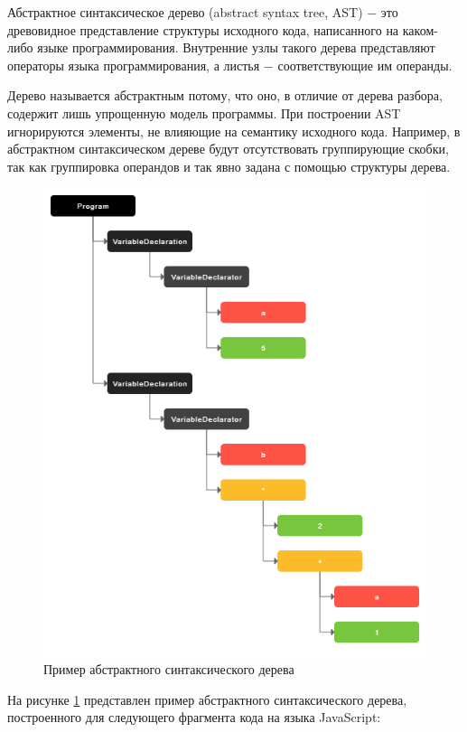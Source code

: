 \documentclass[14pt, a4paper]{article}
\begin{document}
Абстрактное синтаксическое дерево (abstract syntax tree, AST) $-$ это древовидное представление структуры исходного кода, написанного
на каком-либо языке программирования. Внутренние узлы такого дерева представляют операторы языка 
программирования, а листья $-$ соответствующие им операнды.  

Дерево называется абстрактным потому, что оно, в отличие от дерева разбора, содержит лишь упрощенную модель программы. При построении
AST игнорируются элементы, не влияющие на семантику исходного кода. Например, в абстрактном синтаксическом
дереве будут отсутствовать группирующие скобки, так как группировка операндов и так явно задана с помощью структуры дерева.

\begin{figure}[h!]
  \centering
  \includegraphics[scale=0.6]{img/ast.png}
  \caption{Пример абстрактного синтаксического дерева}
  \label{ast}
\end{figure}

На рисунке \ref{ast} представлен пример абстрактного синтаксического дерева, построенного для 
следующего фрагмента кода на языка JavaScript:
\end{document}
